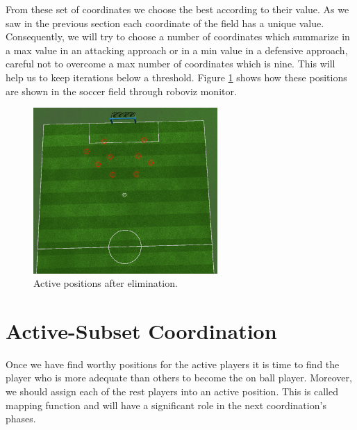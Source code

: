 From these set of coordinates we choose the best according to their value. As we saw in the previous section each coordinate of the field has a unique value. Consequently, we will try to choose a number of coordinates which summarize in a max value in an attacking approach or in a min value in a defensive approach, careful not to overcome a max number of coordinates which is nine. This will help us to keep iterations below a threshold. Figure \ref{fig:ActivePositions3} shows how these positions are shown in the soccer field through roboviz monitor. 
\begin{figure}[htb!]
\centering
  \includegraphics[width=7cm]{Chapter4/figures/Active3.png}
  \caption{Active positions after elimination.} 
  \label{fig:ActivePositions3}
\end{figure}


\section{Active-Subset Coordination}
Once we have find worthy positions for the active players it is time to find the player who is more adequate than others to become the on ball player. Moreover, we should assign each of the rest players into an active position. This is called mapping function and will have a significant role in the next coordination's phases. 
